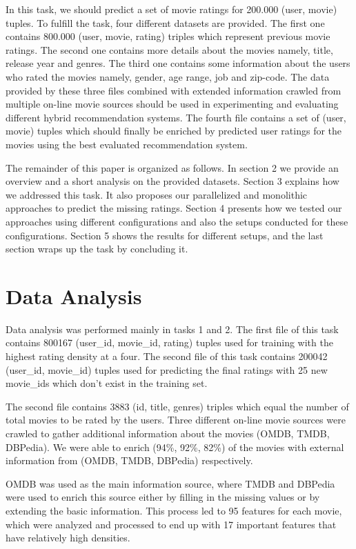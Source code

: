 \documentclass{sigish}
\begin{document}
In this task, we should predict a set of movie ratings for 200.000 (user, movie) tuples. To fulfill the task, four different datasets are provided. The first one contains 800.000 (user, movie, rating) triples which represent previous movie ratings. The second one contains more details about the movies namely, title, release year and genres. The third one contains some information about the users who rated the movies namely, gender, age range, job and zip-code. The data provided by these three files combined with extended information crawled from multiple on-line movie sources should be used in experimenting and evaluating different hybrid recommendation systems. The fourth file contains a set of (user, movie) tuples which should finally be enriched by predicted user ratings for the movies using the best evaluated recommendation system.

The remainder of this paper is organized as follows. In section 2 we provide an overview and a short analysis on the provided datasets. Section 3 explains how we addressed this task. It also proposes our parallelized and monolithic approaches to predict the missing ratings. Section 4 presents how we tested our approaches using different configurations and also the setups conducted for these configurations. Section 5 shows the results for different setups, and the last section wraps up the task by concluding it.

\section{Data Analysis}

Data analysis was performed mainly in tasks 1 and 2. The first file of this task contains 800167 (user\_id, movie\_id, rating) tuples used for training with the highest rating density at a four. The second file of this task contains 200042 (user\_id, movie\_id) tuples used for predicting the final ratings with 25 new movie\_ids which don't exist in the training set.

The second file contains 3883 (id, title, genres) triples which equal the number of total movies to be rated by the users. Three different on-line movie sources were crawled to gather additional information about the movies (OMDB, TMDB, DBPedia). We were able to enrich (94\%, 92\%, 82\%) of the movies with external information from (OMDB, TMDB, DBPedia) respectively.

OMDB was used as the main information source, where TMDB and DBPedia were used to enrich this source either by filling in the missing values or by extending the basic information. This process led to 95 features for each movie, which were analyzed and processed to end up with 17 important features that have relatively high densities.
\end{document}
